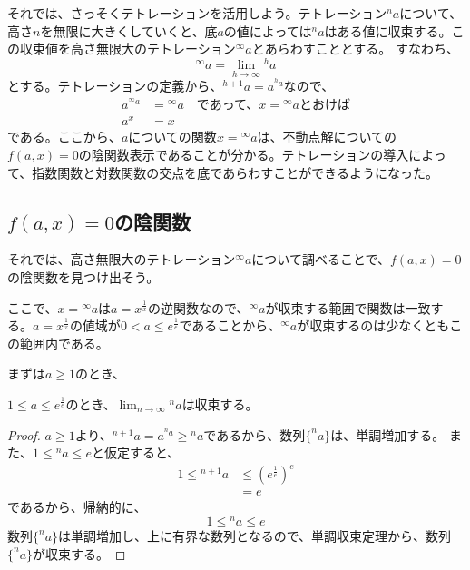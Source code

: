 	それでは、さっそくテトレーションを活用しよう。テトレーション$^n a$について、高さ$n$を無限に大きくしていくと、底$a$の値によっては$^n a$はある値に収束する。この収束値を高さ無限大のテトレーション$^\infty a$とあらわすこととする。
	すなわち、
	\begin{equation*}
		^\infty a = \lim_{h \to \infty} {^h a}
	\end{equation*}
	とする。テトレーションの定義から、$^{h+1} a = a^{^h a}$なので、
	\begin{align*}
		a ^{^\infty a} &= {^\infty a} \quad \text{であって、$x = {^\infty a}$とおけば} \\
		a^x &= x
	\end{align*}
	である。ここから、$a$についての関数$x = {^\infty a}$は、不動点解についての$f(a,x) = 0$の陰関数表示であることが分かる。テトレーションの導入によって、指数関数と対数関数の交点を底であらわすことができるようになった。
	
\subsection{$f(a,x)=0$の陰関数}
	それでは、高さ無限大のテトレーション$^\infty a$について調べることで、$f(a,x)=0$の陰関数を見つけ出そう。
	
	ここで、$x = {^\infty a}$は$a = x^\frac{1}{x}$の逆関数なので、${^\infty a}$が収束する範囲で関数は一致する。$a = x^\frac{1}{x}$の値域が$0 < a \leq e^\frac{1}{e}$であることから、${^\infty a}$が収束するのは少なくともこの範囲内である。
	
	まずは$a \geq 1$のとき、
	\begin{theorem}
		$1 \leq a \leq e^\frac{1}{e}$のとき、$\lim_{n \to \infty} {^n a}$は収束する。
	\end{theorem}
	\begin{proof}
	
		$a \geq 1$より、$^{n+1} a = a ^{^n a} \geq {^n a}$であるから、数列$\{^n a\}$は、単調増加する。
		また、$1 \leq {^n a} \leq e$と仮定すると、
		\begin{align*}
			1 \leq {^{n+1} a} &\leq (e^\frac{1}{e})^e \\
							  &= e
		\end{align*}
		であるから、帰納的に、
		\begin{equation*}
			1 \leq {^n a} \leq e
		\end{equation*}
		数列$\{^n a\}$は単調増加し、上に有界な数列となるので、単調収束定理から、数列$\{^n a\}$が収束する。
	\end{proof}
	
